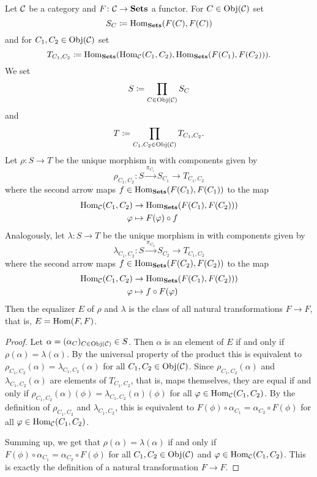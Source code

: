 \begin{prop}\label{prop:end_as_equalizer_concrete}
Let $\mathcal{C}$ be a category and $F\colon \mathcal{C} \to {\ensuremath{{\operatorname{\mathbf{Sets}}}}}$ a functor. For $C \in \operatorname{Obj}(\mathcal{C})$ set \[S_C \coloneqq \operatorname{Hom}_{{\operatorname{\mathbf{Sets}}}}(F(C),F(C))\] and for $C_1,C_2 \in \operatorname{Obj}(\mathcal{C})$ set \[T_{C_1,C_2} \coloneqq \operatorname{Hom}_{{\operatorname{\mathbf{Sets}}}}(\operatorname{Hom}_{\mathcal{C}}(C_1,C_2),\operatorname{Hom}_{{\operatorname{\mathbf{Sets}}}}(F(C_1),F(C_2))).\] We set \[S \coloneqq \prod_{C \in \operatorname{Obj}(\mathcal{C})} S_C\] and \[T \coloneqq \prod_{C_1,C_2 \in \operatorname{Obj}(\mathcal{C})} T_{C_1,C_2}.\] Let $\rho \colon S \to T$ be the unique morphism in \Set{} with components given by
\[
\rho_{C_1,C_2}\colon S \stackrel{\pi_{C_1}}{\longrightarrow} S_{C_1} \to T_{C_1,C_2}
\]
where the second arrow maps $f \in \operatorname{Hom}_{{\operatorname{\mathbf{Sets}}}}(F(C_1),F(C_1))$ to the map
\begin{align*}
\operatorname{Hom}_{\mathcal{C}}(C_1,C_2) &\to \operatorname{Hom}_{{\operatorname{\mathbf{Sets}}}}(F(C_1),F(C_2)))\\
\varphi &\mapsto F(\varphi) \circ f
\end{align*}
Analogously, let $\lambda \colon S \to T$ be the unique morphism in \Set{} with components given by
\[
\lambda_{C_1,C_2}\colon S \stackrel{\pi_{C_2}}{\longrightarrow} S_{C_2} \to T_{C_1,C_2}
\]
where the second arrow maps $f \in \operatorname{Hom}_{{\operatorname{\mathbf{Sets}}}}(F(C_2),F(C_2))$ to the map
\begin{align*}
\operatorname{Hom}_{\mathcal{C}}(C_1,C_2) &\to \operatorname{Hom}_{{\operatorname{\mathbf{Sets}}}}(F(C_1),F(C_2)))\\
\varphi &\mapsto f \circ F(\varphi)
\end{align*}
Then the equalizer $E$ of $\rho$ and $\lambda$ is the class of all natural transformations $F \to F$, that is, $E = \operatorname{Hom}(F,F)$.
\end{prop}
\begin{proof}
Let $\alpha = (\alpha_C)_{C \in \operatorname{Obj}(\mathcal{C})} \in S$. Then $\alpha$ is an element of $E$ if and only if $\rho(\alpha) = \lambda(\alpha)$. By the universal property of the product this is equivalent to $\rho_{C_1,C_2}(\alpha) = \lambda_{C_1,C_2}(\alpha)$ for all $C_1,C_2 \in \operatorname{Obj}(\mathcal{C})$. Since $\rho_{C_1,C_2}(\alpha)$ and $\lambda_{C_1,C_2}(\alpha)$ are elements of $T_{C_1,C_2}$, that is, maps themselves, they are equal if and only if $\rho_{C_1,C_2}(\alpha)(\phi) = \lambda_{C_1,C_2}(\alpha)(\phi)$ for all $\varphi \in \operatorname{Hom}_{\mathcal{C}}(C_1,C_2)$. By the definition of $\rho_{C_1,C_2}$ and $\lambda_{C_1,C_2}$, this is equivalent to $F(\phi) \circ \alpha_{C_1} = \alpha_{C_2} \circ F(\phi)$ for all $\varphi \in \operatorname{Hom}_{\mathcal{C}}(C_1,C_2)$.

Summing up, we get that $\rho(\alpha) = \lambda(\alpha)$ if and only if $F(\phi) \circ \alpha_{C_1} = \alpha_{C_2} \circ F(\phi)$ for all $C_1,C_2 \in \operatorname{Obj}(\mathcal{C})$ and $\varphi \in \operatorname{Hom}_{\mathcal{C}}(C_1,C_2)$. This is exactly the definition of a natural transformation $F \to F$.
\end{proof}

